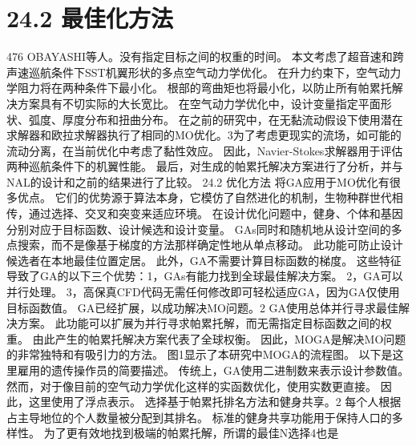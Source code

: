 \documentclass[UTF8,11pt,a4paper,openany,fontset=fandol]{ctexbook}
\begin{document}
\section{24.2 最佳化方法}
476 OBAYASHI等人。没有指定目标之间的权重的时间。 本文考虑了超音速和跨声速巡航条件下SST机翼形状的多点空气动力学优化。 在升力约束下，空气动力学阻力将在两种条件下最小化。 根部的弯曲矩也将最小化，以防止所有帕累托解决方案具有不切实际的大长宽比。 在空气动力学优化中，设计变量指定平面形状、弧度、厚度分布和扭曲分布。 在之前的研究中，在无黏流动假设下使用潜在求解器和欧拉求解器执行了相同的MO优化。3为了考虑更现实的流场，如可能的流动分离，在当前优化中考虑了黏性效应。 因此，Navier-Stokes求解器用于评估两种巡航条件下的机翼性能。 最后，对生成的帕累托解决方案进行了分析，并与NAL的设计和之前的结果进行了比较。 24.2 优化方法 将GA应用于MO优化有很多优点。 它们的优势源于算法本身，它模仿了自然进化的机制，生物种群世代相传，通过选择、交叉和突变来适应环境。 在设计优化问题中，健身、个体和基因分别对应于目标函数、设计候选和设计变量。 GAs同时和随机地从设计空间的多点搜索，而不是像基于梯度的方法那样确定性地从单点移动。 此功能可防止设计候选者在本地最佳位置定居。 此外，GA不需要计算目标函数的梯度。 这些特征导致了GA的以下三个优势：1，GAs有能力找到全球最佳解决方案。 2，GA可以并行处理。 3，高保真CFD代码无需任何修改即可轻松适应GA，因为GA仅使用目标函数值。 GA已经扩展，以成功解决MO问题。2 GA使用总体并行寻求最佳解决方案。 此功能可以扩展为并行寻求帕累托解，而无需指定目标函数之间的权重。 由此产生的帕累托解决方案代表了全球权衡。 因此，MOGA是解决MO问题的非常独特和有吸引力的方法。 图1显示了本研究中MOGA的流程图。 以下是这里雇用的遗传操作员的简要描述。 传统上，GA使用二进制数来表示设计参数值。 然而，对于像目前的空气动力学优化这样的实函数优化，使用实数更直接。 因此，这里使用了浮点表示。 选择基于帕累托排名方法和健身共享。2 每个人根据占主导地位的个人数量被分配到其排名。 标准的健身共享功能用于保持人口的多样性。 为了更有效地找到极端的帕累托解，所谓的最佳N选择4也是
\end{document}
